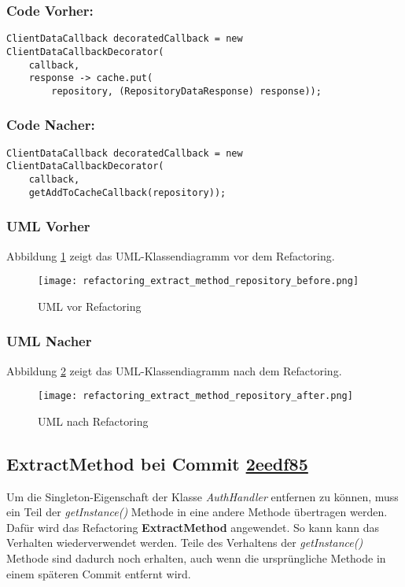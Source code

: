 \subsubsection*{Code Vorher:}
\begin{lstlisting}[breaklines=false]
ClientDataCallback decoratedCallback = new ClientDataCallbackDecorator(
	callback, 
	response -> cache.put(
		repository, (RepositoryDataResponse) response));
\end{lstlisting}
\subsubsection*{Code Nacher:}
\begin{lstlisting}[breaklines=false]
ClientDataCallback decoratedCallback = new ClientDataCallbackDecorator(
	callback, 
	getAddToCacheCallback(repository));
\end{lstlisting}

\newpage
\subsubsection{UML Vorher}
Abbildung \ref{fig:ExtractMethod_Refactoring_Before} zeigt das UML-Klassendiagramm vor dem Refactoring.
\begin{figure}[h]
  \texttt{[image: refactoring\_extract\_method\_repository\_before.png]}
  \centering
  \caption{UML vor Refactoring}
  \label{fig:ExtractMethod_Refactoring_Before}
\end{figure}

\newpage
\subsubsection{UML Nacher}
Abbildung \ref{fig:ExtractMethod_Refactoring_After} zeigt das UML-Klassendiagramm nach dem Refactoring.
\begin{figure}[h]
  \texttt{[image: refactoring\_extract\_method\_repository\_after.png]}
  \caption{UML nach Refactoring}
  \label{fig:ExtractMethod_Refactoring_After}
\end{figure}
\newpage


\subsection{ExtractMethod bei Commit \href{https://github.com/lukaspanni/OpenSourceStats/commit/2eedf85be90e2566aa3811f9ccd3bac860c444a2} {2eedf85}}
\label{sec:ExtractMethod_AuthHandler}

Um die Singleton-Eigenschaft der Klasse \textit{AuthHandler} entfernen zu können, muss ein Teil der \textit{getInstance()} Methode in eine andere Methode übertragen werden.
Dafür wird das Refactoring \textbf{ExtractMethod} angewendet. So kann kann das Verhalten wiederverwendet werden. Teile des Verhaltens der \textit{getInstance()} Methode sind dadurch noch erhalten, auch wenn die ursprüngliche Methode in einem späteren Commit entfernt wird.


